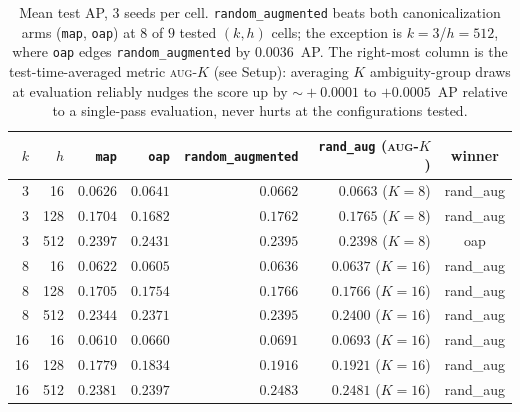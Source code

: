 \documentclass[11pt]{article}
\newcommand{\win}{\cellcolor{green!18}}
\newcommand{\tie}{\cellcolor{gray!10}}
\begin{document}
\begin{table}[h]
\centering\small
\setlength{\tabcolsep}{5pt}
\begin{tabular}{r r r r r r c}
\toprule
$k$  &  $h$  & \texttt{map}    & \texttt{oap}    & \texttt{random\_augmented} & \texttt{rand\_aug} (\textsc{aug-$K$}) & winner \\
\midrule
 3   &   16  & $0.0626$        & $0.0641$        & \win $0.0662$               & $0.0663$ ($K\!=\!8$)  & rand\_aug \\
 3   &  128  & $0.1704$        & $0.1682$        & \win $0.1762$               & $0.1765$ ($K\!=\!8$)  & rand\_aug \\
 3   &  512  & $0.2397$        & \tie $0.2431$   & $0.2395$                    & $0.2398$ ($K\!=\!8$)  & oap       \\
\midrule
 8   &   16  & $0.0622$        & $0.0605$        & \win $0.0636$               & $0.0637$ ($K\!=\!16$) & rand\_aug \\
 8   &  128  & $0.1705$        & $0.1754$        & \win $0.1766$               & $0.1766$ ($K\!=\!16$) & rand\_aug \\
 8   &  512  & $0.2344$        & $0.2371$        & \win $0.2395$               & $0.2400$ ($K\!=\!16$) & rand\_aug \\
\midrule
16   &   16  & $0.0610$        & $0.0660$        & \win $0.0691$               & $0.0693$ ($K\!=\!16$) & rand\_aug \\
16   &  128  & $0.1779$        & $0.1834$        & \win $0.1916$               & $0.1921$ ($K\!=\!16$) & rand\_aug \\
16   &  512  & $0.2381$        & $0.2397$        & \win $0.2483$               & $0.2481$ ($K\!=\!16$) & rand\_aug \\
\bottomrule
\end{tabular}
\caption{Mean test AP, $3$ seeds per cell. \texttt{random\_augmented}
beats both canonicalization arms (\texttt{map}, \texttt{oap}) at $8$ of
$9$ tested $(k,h)$ cells; the exception is $k\!=\!3$/$h\!=\!512$, where
\texttt{oap} edges \texttt{random\_augmented} by $0.0036$~AP. The
right-most column is the test-time-averaged metric \textsc{aug-$K$}
(see Setup): averaging $K$ ambiguity-group draws at evaluation reliably
nudges the score up by $\sim\!+0.0001$ to $+0.0005$~AP relative to a
single-pass evaluation, never hurts at the configurations tested.}
\label{tab:headline}
\end{table}

\end{document}
